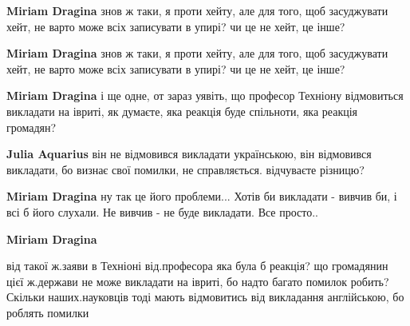 \begin{itemize}
\begin{itemize}
\textbf{Miriam Dragina} знов ж таки, я проти хейту, але для того, щоб засуджувати хейт, не варто може всіх записувати в упирі? чи це не хейт, це інше?

 
\textbf{Miriam Dragina} знов ж таки, я проти хейту, але для того, щоб засуджувати хейт, не варто може всіх записувати в упирі? чи це не хейт, це інше?

 
\textbf{Miriam Dragina} і ще одне, от зараз уявіть, що професор Техніону відмовиться викладати на івриті, як думаєте, яка реакція буде спільноти, яка реакція громадян?

 
\textbf{Julia Aquarius} він не відмовився викладати українською, він відмовився викладати, бо визнає свої помилки, не справляється. відчуваєте різницю?

 
\textbf{Miriam Dragina} ну так це його проблеми... Хотів би викладати - вивчив би, і всі б його слухали. Не вивчив - не буде викладати. Все просто..

 
\textbf{Miriam Dragina} 

від такої ж.заяви в Техніоні від.професора яка була б реакція? що громадянин
цієї ж.держави не може викладати на івриті, бо надто багато помилок робить?
Скільки наших.науковців тоді мають відмовитись від викладання англійською, бо
роблять помилки


\end{itemize}
\end{itemize}
